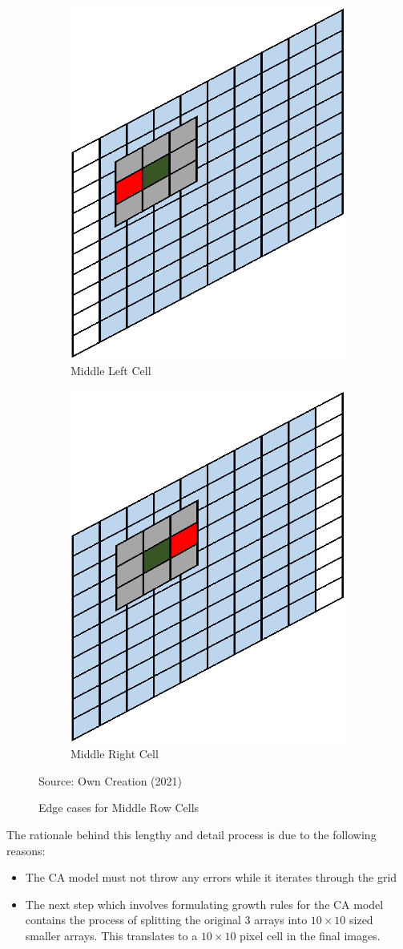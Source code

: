 \begin{figure}[H]
\centering
\begin{subfigure}{.4\textwidth}
  \centering
  \includegraphics[width=.5\linewidth]{Figures/Chapter3/midleft}
  \caption{Middle Left Cell}
\end{subfigure}%
\begin{subfigure}{.4\textwidth}
  \centering
  \includegraphics[width=.5\linewidth]{Figures/Chapter3/midright}
  \caption{Middle Right Cell}
\end{subfigure}
\caption{Edge cases for Middle Row Cells}
\begin{center}
Source: Own Creation (2021)
\end{center}
\label{fig:e4}
\end{figure}
The rationale behind this lengthy and detail process is due to the following reasons:
\begin{itemize}
\item The CA model must not throw any errors while it iterates through the grid
\item The next step which involves formulating growth rules for the CA model contains the process of splitting the original 3 arrays into $10 \times 10$ sized smaller arrays. This translates to a $10 \times 10$ pixel cell in the final images.
\end{itemize}
